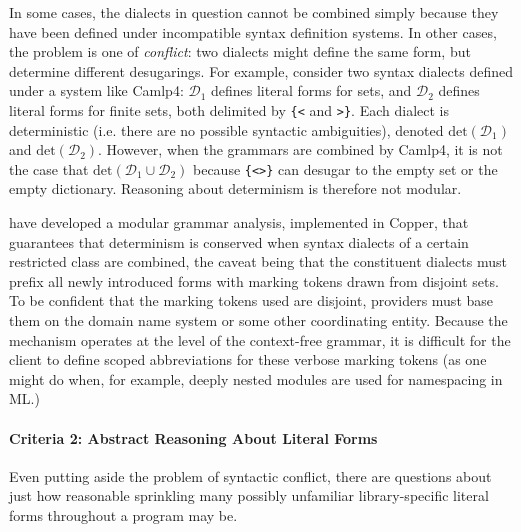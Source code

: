 \documentclass[acmsmall,10pt,review,anonymous]{acmart}\settopmatter{printfolios=true}
\begin{document}
In some cases, the dialects in question cannot be combined simply because they have been defined under incompatible syntax definition systems. In other cases, the problem is one of \emph{conflict}: two dialects might define the same form, but determine different desugarings. For example, consider two syntax dialects defined under a system like Camlp4: $\mathcal{D}_1$ defines literal forms for sets, and $\mathcal{D}_2$ defines literal forms for finite sets, both delimited by \verb~{<~ and \verb~>}~. Each dialect is deterministic (i.e. there are no possible syntactic ambiguities), denoted $\mathrm{det}(\mathcal{D}_1)$ and $\mathrm{det}(\mathcal{D}_2)$. However, when the grammars are combined by Camlp4, it is not the case that $\mathrm{det}(\mathcal{D}_1 \cup \mathcal{D}_2)$ because \verb~{<>}~ can desugar to the empty set or the empty dictionary. Reasoning about determinism is therefore not modular. %

\citet{conf/pldi/SchwerdfegerW09} have developed a modular grammar analysis, implemented in Copper, that guarantees that determinism is conserved when syntax dialects of a certain restricted class are combined, the caveat being that the constituent dialects must prefix all newly introduced forms with marking tokens drawn from disjoint sets. To be confident that the marking tokens used are disjoint, providers must base them on the domain name system or some other coordinating entity. Because the mechanism operates at the level of the context-free grammar, it is difficult for the client to define scoped abbreviations for these verbose marking tokens (as one might do when, for example, deeply nested modules are used for namespacing in ML.)

\paragraph{Criteria 2: Abstract Reasoning About Literal Forms}





Even putting aside the problem of syntactic conflict, there are questions about just how reasonable sprinkling many possibly unfamiliar library-specific literal forms  throughout a program may be. 
\end{document}
